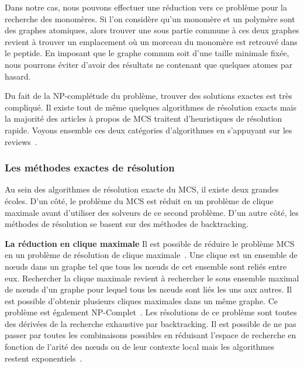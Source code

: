 Dans notre cas, nous pouvons effectuer une réduction vers ce problème pour la recherche des monomères.
Si l'on considère qu'un monomère et un polymère sont des graphes atomiques, alors trouver une sous partie commune à ces deux graphes revient à trouver un emplacement où un morceau du monomère est retrouvé dans le peptide.
En imposant que le graphe commun soit d'une taille minimale fixée, nous pourrons éviter d'avoir des résultats ne contenant que quelques atomes par hasard.

Du fait de la NP-complétude du problème, trouver des solutions exactes est très compliqué.
Il existe tout de même quelques algorithmes de résolution exacts mais la majorité des articles à propos de MCS traitent d'heuristiques de résolution rapide.
Voyons ensemble ces deux catégories d'algorithmes en s'appuyant sur les reviews~\cite{raymond_maximum_2002, ehrlich_maximum_2011}.


\subsubsection{Les méthodes exactes de résolution}

Au sein des algorithmes de résolution exacte du MCS, il existe deux grandes écoles.
D'un côté, le problème du MCS est réduit en un problème de clique maximale avant d'utiliser des solveurs de ce second problème.
D'un autre côté, les méthodes de résolution se basent sur des méthodes de backtracking.



\textbf{La réduction en clique maximale}
Il est possible de réduire le problème MCS en un problème de résolution de clique maximale~\cite{pelillo_matching_1999,grosso_simple_2008,rahman_small_2009}.
Une clique est un ensemble de n\oe{}uds dans un graphe tel que tous les n\oe{}uds de cet ensemble sont reliés entre eux.
Rechercher la clique maximale revient à rechercher le sous ensemble maximal de n\oe{}uds d'un graphe pour lequel tous les n\oe{}uds sont liés les uns aux autres.
Il est possible d'obtenir plusieurs cliques maximales dans un même graphe.
Ce problème est également NP-Complet~\cite{akkoyunlu_enumeration_1973}.
Les résolutions de ce problème sont toutes des dérivées de la recherche exhaustive par backtracking.
Il est possible de ne pas passer par toutes les combinaisons possibles en réduisant l'espace de recherche en fonction de l'arité des n\oe{}uds ou de leur contexte local mais les algorithmes restent exponentiels~\cite{tomita_worst-case_2004}.

